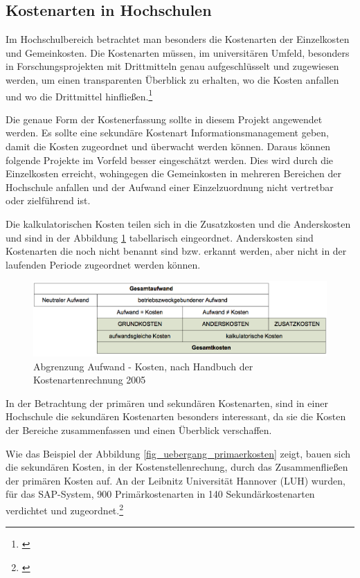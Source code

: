 \subsection{Kostenarten in Hochschulen}
Im Hochschulbereich betrachtet man besonders die Kostenarten der Einzelkosten und Gemeinkosten. Die Kostenarten müssen, im universitären Umfeld, besonders in Forschungsprojekten mit Drittmitteln genau aufgeschlüsselt und zugewiesen werden, um einen transparenten Überblick zu erhalten, wo die Kosten anfallen und wo die Drittmittel hinfließen.\footnote{\cite{pkl_2005}}

Die genaue Form der Kostenerfassung sollte in diesem Projekt angewendet werden. Es sollte eine sekundäre Kostenart Informationsmanagement geben, damit die Kosten zugeordnet und überwacht werden können. Daraus können folgende Projekte im Vorfeld besser eingeschätzt werden. Dies wird durch die Einzelkosten erreicht, wohingegen die Gemeinkosten in mehreren Bereichen der Hochschule anfallen und der Aufwand einer Einzelzuordnung nicht vertretbar oder zielführend ist.

Die kalkulatorischen Kosten teilen sich in die Zusatzkosten und die Anderskosten und sind in der Abbildung \ref{fig_abgrenzung_aufwand} tabellarisch eingeordnet. Anderskosten sind Kostenarten die noch nicht benannt sind bzw. erkannt werden, aber nicht in der laufenden Periode zugeordnet werden können. 

\begin{figure}[h!]
	\centering
	\includegraphics[width=\textwidth]
	{kapitel/gruppe4_2/bilder/abgrenzung_aufwand}
	\caption{Abgrenzung Aufwand - Kosten, nach Handbuch der Kostenartenrechnung 2005}
	\label{fig_abgrenzung_aufwand}
\end{figure}

In der Betrachtung der primären und sekundären Kostenarten, sind in einer Hochschule die sekundären Kostenarten besonders interessant, da sie die Kosten der Bereiche zusammenfassen und einen Überblick verschaffen.

Wie das Beispiel der Abbildung \ref{fig_uebergang_primaerkosten} zeigt, bauen sich die sekundären Kosten, in der Kostenstellenrechung, durch das Zusammenfließen der primären Kosten auf. An der Leibnitz Universität Hannover (LUH) wurden, für das SAP-System, 900 Primärkostenarten in 140 Sekundärkostenarten verdichtet und zugeordnet.\footnote{\cite{pkl_2005}}

